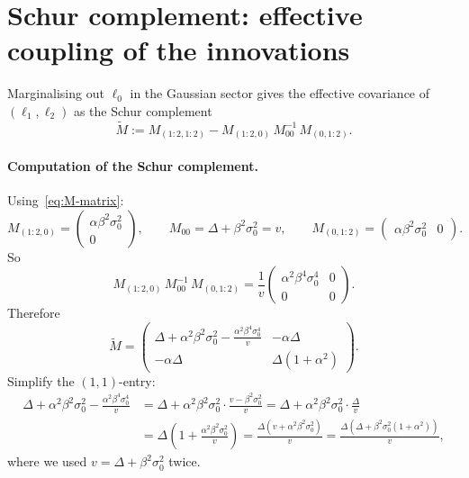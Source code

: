 \documentclass[11pt,a4paper,openany]{book}
\theoremstyle{plainserif}
\theoremstyle{definition}
\theoremstyle{remarkstyle}
\begin{document}
\section{Schur complement: effective coupling of the innovations}

Marginalising out $\ell_0$ in the Gaussian sector gives the effective
covariance of $(\ell_1, \ell_2)$ as the Schur complement
\begin{equation}
\widetilde M := M_{(1:2,1:2)} - M_{(1:2,0)}\, M_{00}^{-1}\, M_{(0,1:2)}.
\end{equation}

\paragraph{Computation of the Schur complement.}
Using~\eqref{eq:M-matrix}:
\begin{equation}
M_{(1:2,0)} = \begin{pmatrix} \alpha\beta^2\sigma_0^2 \\ 0 \end{pmatrix},\qquad
M_{00} = \Delta + \beta^2\sigma_0^2 = v,\qquad
M_{(0,1:2)} = \begin{pmatrix} \alpha\beta^2\sigma_0^2 & 0\end{pmatrix}.
\end{equation}
So
\begin{equation}
M_{(1:2,0)}\,M_{00}^{-1}\, M_{(0,1:2)} =
\frac{1}{v}\begin{pmatrix}\alpha^2\beta^4\sigma_0^4 & 0 \\ 0 & 0\end{pmatrix}.
\end{equation}
Therefore
\begin{equation}
\widetilde M = \begin{pmatrix}
\Delta + \alpha^2\beta^2\sigma_0^2 - \frac{\alpha^2\beta^4\sigma_0^4}{v} & -\alpha\Delta \\
-\alpha\Delta & \Delta(1+\alpha^2)
\end{pmatrix}.
\end{equation}
Simplify the $(1,1)$-entry:
\begin{align}
\Delta + \alpha^2\beta^2\sigma_0^2 - \frac{\alpha^2\beta^4\sigma_0^4}{v}
 &= \Delta + \alpha^2\beta^2\sigma_0^2\cdot\frac{v - \beta^2\sigma_0^2}{v}
  = \Delta + \alpha^2\beta^2\sigma_0^2\cdot\frac{\Delta}{v} \nonumber\\
 &= \Delta\left(1 + \frac{\alpha^2\beta^2\sigma_0^2}{v}\right)
  = \frac{\Delta(v + \alpha^2\beta^2\sigma_0^2)}{v}
  = \frac{\Delta(\Delta + \beta^2\sigma_0^2(1+\alpha^2))}{v},
\end{align}
where we used $v = \Delta + \beta^2\sigma_0^2$ twice.
\end{document}
